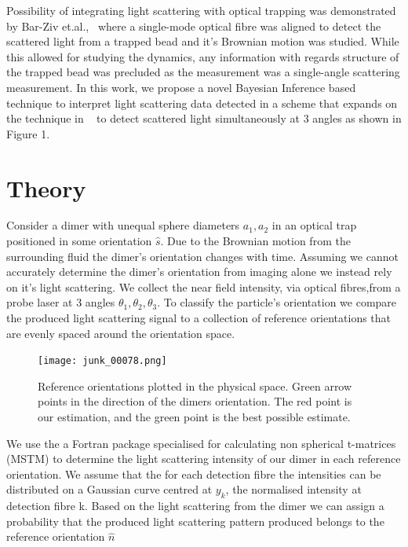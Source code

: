 \documentclass[final,3p, twocolumn]{elsarticle}
\begin{document}
Possibility of integrating light scattering with optical trapping was demonstrated by Bar-Ziv et.al.,~\cite{Bar-Ziv_1998} where a single-mode optical fibre was aligned to detect the scattered light from a trapped bead and it's Brownian motion was studied. While this allowed for studying the dynamics, any information with regards structure of the trapped bead was precluded as the measurement was a single-angle scattering measurement.
In this work, we propose a novel Bayesian Inference based technique to interpret light scattering data detected in a scheme that expands on the technique in ~\cite{Bar-Ziv_1998} to detect scattered light simultaneously at 3 angles as shown in Figure 1.

\section{Theory}
\label{2}

Consider a dimer with unequal sphere diameters $a_1, a_2$ in an optical trap positioned in some orientation $\hat{s}$. Due to the Brownian motion from the surrounding fluid the dimer's orientation changes with time. Assuming we cannot accurately determine the dimer's orientation from imaging alone we instead rely on it's light scattering. We collect the near field intensity, via optical fibres,from a probe laser at 3 angles $\theta_1, \theta_2, \theta_3$. To classify the particle's orientation we compare the produced light scattering signal to a collection of reference orientations that are evenly spaced around the orientation space.

\begin{figure}[t]
	\centering
	\texttt{[image: junk\_00078.png]}
	\caption{Reference orientations plotted in the physical space. Green arrow points in the direction of the dimers orientation. The red point is our estimation, and the green point is the best possible estimate.}
\end{figure}

We use the a Fortran package specialised for calculating non spherical t-matrices (MSTM) \cite{MSTM} to determine the light scattering intensity of our dimer in each reference orientation. We assume that the for each detection fibre the intensities can be distributed on a Gaussian curve centred at $y_k$, the normalised intensity at detection fibre k. Based on the light scattering from the dimer we can assign a probability that the produced light scattering pattern produced belongs to the reference orientation $\hat{n}$
\end{document}
